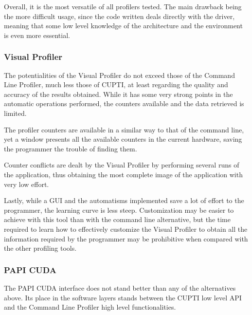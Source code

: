 Overall, it is the most versatile of all profilers tested. The main drawback being the more difficult usage, since the code written deals directly with the driver, meaning that some low level knowledge of the architecture and the environment is even more essential.

\subsubsection{Visual Profiler}
\label{sec:523}

The potentialities of the Visual Profiler do not exceed those of the Command Line Profiler, much less those of CUPTI, at least regarding the quality and accuracy of the results obtained. While it has some very strong points in the automatic operations performed, the counters available and the data retrieved is limited.

The profiler counters are available in a similar way to that of the command line, yet a window presents all the available counters in the current hardware, saving the programmer the trouble of finding them.

Counter conflicts are dealt by the Visual Profiler by performing several runs of the application, thus obtaining the most complete image of the application with very low effort.

Lastly, while a GUI and the automatisms implemented save a lot of effort to the programmer, the learning curve is less steep. Customization may be easier to achieve with this tool than with the command line alternative, but the time required to learn how to effectively customize the Visual Profiler to obtain all the information required by the programmer may be prohibitive when compared with the other profiling tools.

\subsubsection{PAPI CUDA}
\label{sec:534}



The PAPI CUDA interface does not stand better than any of the alternatives above. Its place in the software layers stands between the CUPTI low level API and the Command Line Profiler high level functionalities.

